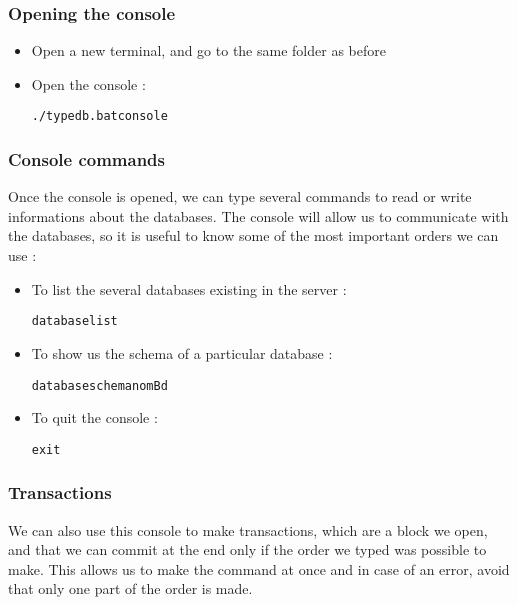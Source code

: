 \documentclass[runningheads]{llncs}
\begin{document}
\subsubsection{Opening the console}
\begin{itemize}
\item Open a new terminal, and go to the same folder as before
\item Open the console :   \begin{alltt}./typedb.bat console\end{alltt}     
\end{itemize}

\subsubsection{Console commands}

Once the console is opened, we can type several commands to read or write informations about the databases. The console will allow us to communicate with the databases, so it is useful to know some of the most important orders we can use :

\begin{itemize}
\item To list the several databases existing in the server :    \begin{alltt}database list\end{alltt}       
\item To show us the schema of a particular database :    \begin{alltt}database schema nomBd\end{alltt}       
\item To quit the console :                        \begin{alltt}exit\end{alltt}  
\end{itemize}

  \subsubsection{Transactions}
We can also use this console to make transactions, which are a block we open, and that we can commit at the end only if the order we typed was possible to make. This allows us to make the command at once and in case of an error, avoid that only one part of the order is made.
\end{document}
